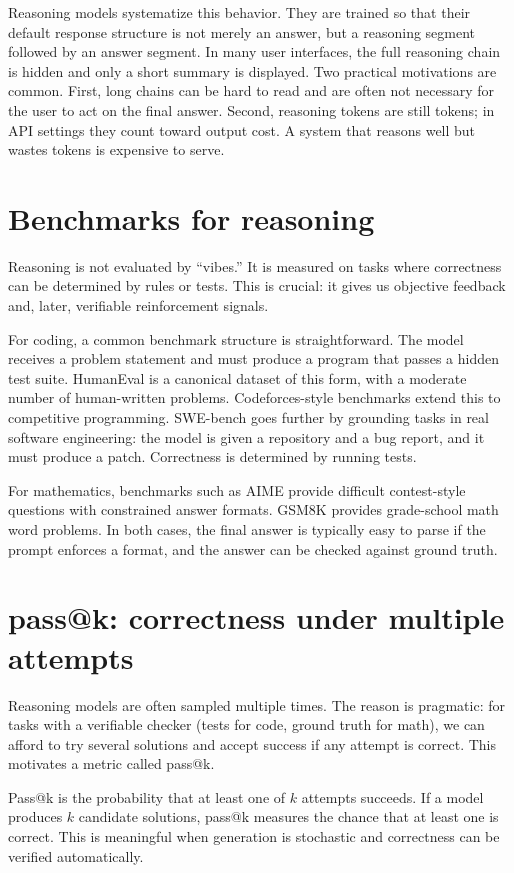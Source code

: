 Reasoning models systematize this behavior. They are trained so that their default response structure is not merely an answer, but a reasoning segment followed by an answer segment. In many user interfaces, the full reasoning chain is hidden and only a short summary is displayed. Two practical motivations are common. First, long chains can be hard to read and are often not necessary for the user to act on the final answer. Second, reasoning tokens are still tokens; in API settings they count toward output cost. A system that reasons well but wastes tokens is expensive to serve.

\section{Benchmarks for reasoning}
Reasoning is not evaluated by “vibes.” It is measured on tasks where correctness can be determined by rules or tests. This is crucial: it gives us objective feedback and, later, verifiable reinforcement signals.

For coding, a common benchmark structure is straightforward. The model receives a problem statement and must produce a program that passes a hidden test suite. HumanEval is a canonical dataset of this form, with a moderate number of human-written problems. Codeforces-style benchmarks extend this to competitive programming. SWE-bench goes further by grounding tasks in real software engineering: the model is given a repository and a bug report, and it must produce a patch. Correctness is determined by running tests.

For mathematics, benchmarks such as AIME provide difficult contest-style questions with constrained answer formats. GSM8K provides grade-school math word problems. In both cases, the final answer is typically easy to parse if the prompt enforces a format, and the answer can be checked against ground truth.

\section{pass@k: correctness under multiple attempts}
Reasoning models are often sampled multiple times. The reason is pragmatic: for tasks with a verifiable checker (tests for code, ground truth for math), we can afford to try several solutions and accept success if any attempt is correct. This motivates a metric called pass@k.

Pass@k is the probability that at least one of \(k\) attempts succeeds. If a model produces \(k\) candidate solutions, pass@k measures the chance that at least one is correct. This is meaningful when generation is stochastic and correctness can be verified automatically.

